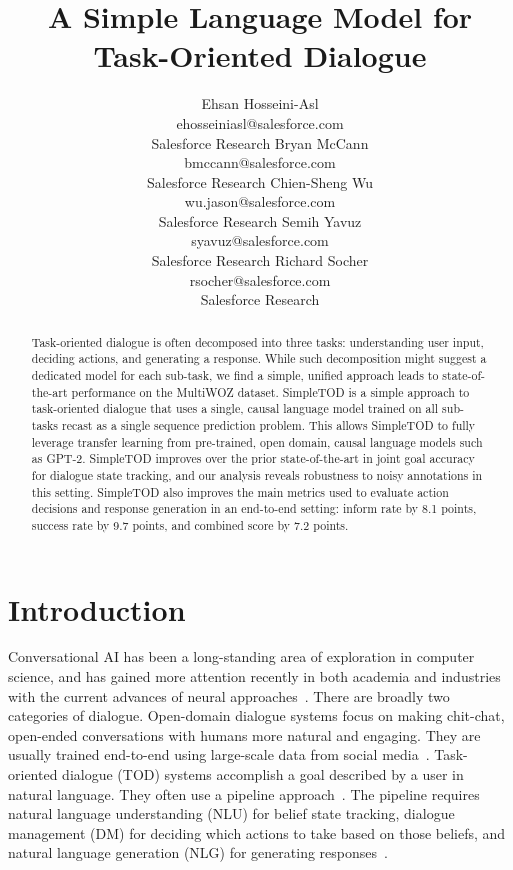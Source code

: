 \documentclass{article}
\title{A Simple Language Model for\\ Task-Oriented Dialogue}
\author{Ehsan Hosseini-Asl\\
ehosseiniasl@salesforce.com \\
Salesforce Research
\And 
Bryan McCann\\
bmccann@salesforce.com \\
Salesforce Research
\AND
Chien-Sheng Wu\\
wu.jason@salesforce.com \\
Salesforce Research
\And
Semih Yavuz\\
syavuz@salesforce.com \\
Salesforce Research
\And
Richard Socher\\
rsocher@salesforce.com \\
Salesforce Research
}
\begin{document}
\maketitle

\begin{abstract}
Task-oriented dialogue is often decomposed into three tasks: 
understanding user input, 
deciding actions, and 
generating a response.
While such decomposition might suggest a dedicated model for each sub-task, we find a simple, unified approach leads to state-of-the-art performance 
on the MultiWOZ dataset.
SimpleTOD is a simple approach to task-oriented dialogue that uses a single, causal language model trained on all sub-tasks recast as a single sequence prediction problem.
This allows SimpleTOD to fully leverage transfer learning from pre-trained, open domain, causal language models such as GPT-2. 
SimpleTOD improves over the prior state-of-the-art
in joint goal accuracy for dialogue state tracking, and our analysis reveals robustness to noisy annotations in this setting.
SimpleTOD also improves the main metrics used to evaluate action decisions and response generation in an end-to-end setting:
inform rate by 8.1 points, success rate by 9.7 points, and combined score by 7.2 points. 


\end{abstract} \section{Introduction}
\label{sec:introduction}



Conversational AI has been a long-standing area of exploration in computer science, 
and has gained more attention recently in both academia and industries 
with the current advances of neural approaches~\citep{gao2019neural}.
There are broadly two categories of dialogue. 
Open-domain dialogue systems focus on making chit-chat,
open-ended conversations with humans more natural and engaging.
They are usually trained end-to-end using large-scale data from social media~\citep{meena2020adiwardana, roller2020recipes}. 
Task-oriented dialogue (TOD) systems accomplish a goal described by a user in natural language.
They often use a pipeline approach~\citep{smith1994spoken, young2013pomdb}.
The pipeline requires natural language understanding (NLU) for belief state tracking, 
dialogue management (DM) for deciding which actions to take based on those beliefs, 
and natural language generation (NLG) for generating responses~\citep{wen2016network}.
\end{document}
